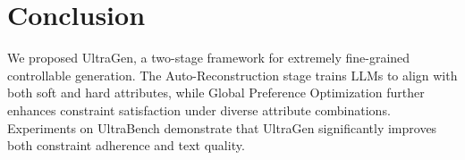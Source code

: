 \section{Conclusion}
We proposed UltraGen, a two-stage framework for extremely fine-grained controllable generation. The Auto-Reconstruction stage trains LLMs to align with both soft and hard attributes, while Global Preference Optimization further enhances constraint satisfaction under diverse attribute combinations. Experiments on UltraBench demonstrate that UltraGen significantly improves both constraint adherence and text quality. 